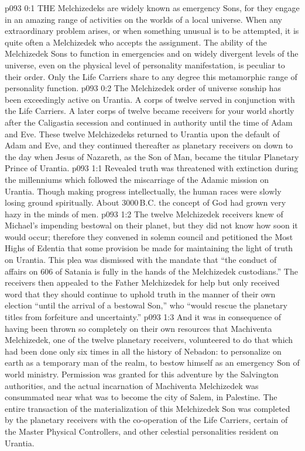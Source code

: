 \vs p093 0:1 THE Melchizedeks are widely known as emergency Sons, for they engage in an amazing range of activities on the worlds of a local universe. When any extraordinary problem arises, or when something unusual is to be attempted, it is quite often a Melchizedek who accepts the assignment. The ability of the Melchizedek Sons to function in emergencies and on widely divergent levels of the universe, even on the physical level of personality manifestation, is peculiar to their order. Only the Life Carriers share to any degree this metamorphic range of personality function.
\vs p093 0:2 \pc The Melchizedek order of universe sonship has been exceedingly active on Urantia. A corps of twelve served in conjunction with the Life Carriers. A later corps of twelve became receivers for your world shortly after the Caligastia secession and continued in authority until the time of Adam and Eve. These twelve Melchizedeks returned to Urantia upon the default of Adam and Eve, and they continued thereafter as planetary receivers on down to the day when Jesus of Nazareth, as the Son of Man, became the titular Planetary Prince of Urantia.
\vs p093 1:1 Revealed truth was threatened with extinction during the millenniums which followed the miscarriage of the Adamic mission on Urantia. Though making progress intellectually, the human races were slowly losing ground spiritually. About 3000\,B.C. the concept of God had grown very hazy in the minds of men.
\vs p093 1:2 The twelve Melchizedek receivers knew of Michael’s impending bestowal on their planet, but they did not know how soon it would occur; therefore they convened in solemn council and petitioned the Most Highs of Edentia that some provision be made for maintaining the light of truth on Urantia. This plea was dismissed with the mandate that “the conduct of affairs on 606 of Satania is fully in the hands of the Melchizedek custodians.” The receivers then appealed to the Father Melchizedek for help but only received word that they should continue to uphold truth in the manner of their own election “until the arrival of a bestowal Son,” who “would rescue the planetary titles from forfeiture and uncertainty.”
\vs p093 1:3 And it was in consequence of having been thrown so completely on their own resources that Machiventa Melchizedek, one of the twelve planetary receivers, volunteered to do that which had been done only six times in all the history of Nebadon: to personalize on earth as a temporary man of the realm, to bestow himself as an emergency Son of world ministry. Permission was granted for this adventure by the Salvington authorities, and the actual incarnation of Machiventa Melchizedek was consummated near what was to become the city of Salem, in Palestine. The entire transaction of the materialization of this Melchizedek Son was completed by the planetary receivers with the co\hyp{}operation of the Life Carriers, certain of the Master Physical Controllers, and other celestial personalities resident on Urantia.
